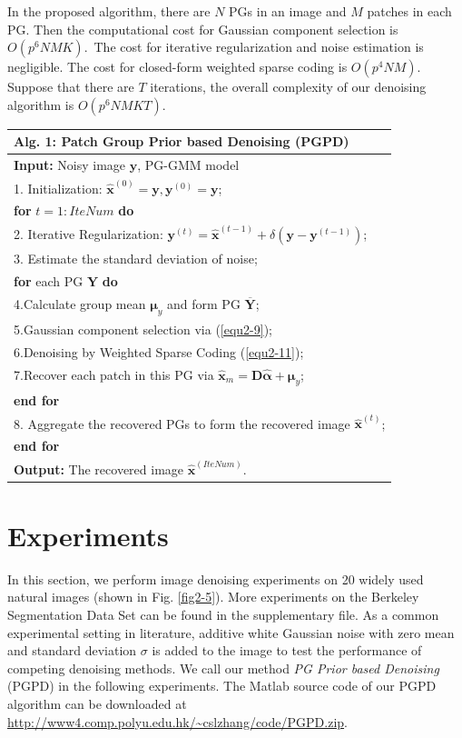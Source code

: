 In the proposed algorithm, there are $N$ PGs in an image and $M$ patches in each PG. Then the computational cost for Gaussian component selection is $O(p^{6}NMK)$.\ The cost for iterative regularization and noise estimation is negligible. The cost for closed-form weighted sparse coding is $O(p^{4}NM)$. Suppose that there are $T$ iterations, the overall complexity of our denoising algorithm is $O(p^{6}NMKT)$.
\begin{table}
\label{alg1}
\begin{tabular}{l}
\hline
\textbf{Alg. 1}: Patch Group Prior based Denoising (PGPD)
\\
\hline
\textbf{Input:} Noisy image $\bm{y}$, PG-GMM model
\\
1. Initialization: $\hat{\bm{x}}^{(0)}=\bm{y},\bm{y}^{(0)}=\bm{y}$;
\\
\textbf{for} $t = 1:IteNum$ \textbf{do}
\\
2. Iterative Regularization:
$\bm{y}^{(t)}=\hat{\bm{x}}^{(t-1)}+\delta(\bm{y}-\bm{y}^{(t-1)})$;
\\
3. Estimate the standard deviation of noise;
\\
\quad\textbf{for} each PG $\bm{Y}$ \textbf{do}
\\
4.\quad Calculate group mean $\bm{\mu}_{y}$ and form PG $\bm{\overline{Y}}$;
\\
5.\quad Gaussian component selection via (\ref{equ2-9});
\\
6.\quad Denoising by Weighted Sparse Coding (\ref{equ2-11});
\\
7.\quad Recover each patch in this PG via $\hat{\bm{x}}_{m}=\bm{D}\hat{\bm{\alpha}}+\bm{\mu}_{y}$;
\\
\quad\textbf{end for}
\\
8. Aggregate the recovered PGs to form the recovered image $\hat{\bm{x}}^{(t)}$;
\\
\textbf{end for}
\\
\textbf{Output:} The recovered image $\hat{\bm{x}}^{(IteNum)}$.\\
\hline
\end{tabular}
\end{table}
\section{Experiments}
In this section, we perform image denoising experiments on 20 widely used natural images (shown in Fig. \ref{fig2-5}). More experiments on the Berkeley Segmentation Data Set \cite{bsds} can be found in the supplementary file. As a common experimental setting in literature, additive white Gaussian noise with zero mean and standard deviation $\sigma$ is added to the image to test the performance of competing denoising methods. We call our method \textsl{PG Prior based Denoising} (PGPD) in the following experiments. The Matlab source code of our PGPD algorithm can be downloaded at \url{http://www4.comp.polyu.edu.hk/~cslzhang/code/PGPD.zip}.

